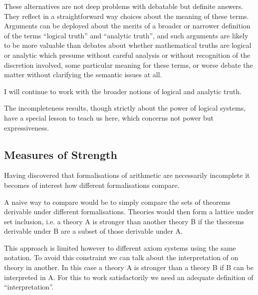 These alternatives are not deep problems with debatable but definite answers.
They reflect in a straightforward way choices about the meaning of these terms.
Arguments can be deployed about the merits of a broader or narrower definition of the terms ``logical truth'' and ``analytic truth'', and such arguments are likely to be more valuable than debates about whether mathematical truths are logical or analytic which presume without careful analysis or without recognition of the discretion involved, some particular meaning for these terms, or worse debate the matter without clarifying the semantic issues at all.

I will continue to work with the broader notions of logical and analytic truth.

The incompleteness results, though strictly about the power of logical systems, have a special lesson to teach us here, which concerns not power but expressiveness.
 
\subsection{Measures of Strength}

Having discovered that formalisations of arithmetic are necessarily incomplete it becomes of interest how different formalisations compare.

A naive way to compare would be to simply compare the sets of theorems derivable under different formalisations.
Theories would then form a lattice under set inclusion, i.e. a theory A is stronger than another theory B if the theorems derivable under B are a subset of those derivable under A.

This approach is limited however to different axiom systems using the same notation.
To avoid this constraint we can talk about the interpretation of on theory in another.
In this case a theory A is stronger than a theory B if B can be interpreted in A.
For this to work satisfactorily we need an adequate definition of ``interpretation''.

